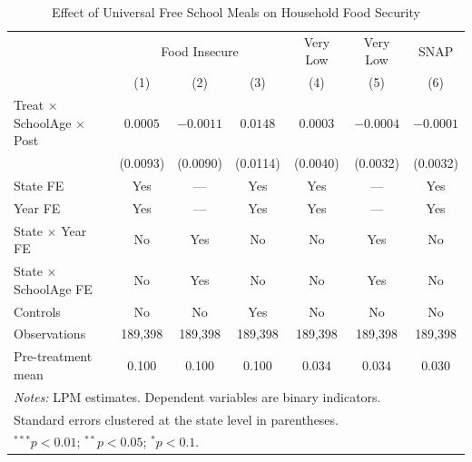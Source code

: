 \begin{table}[t]
\centering
\caption{Effect of Universal Free School Meals on Household Food Security}
\label{tab:main}
\small
\begin{tabular}{lcccccc}
\hline\hline
 & \multicolumn{3}{c}{Food Insecure} & Very Low & Very Low & SNAP \\
 & (1) & (2) & (3) & (4) & (5) & (6) \\
\hline
Treat $\times$ SchoolAge $\times$ Post & $0.0005$ & $-0.0011$ & $0.0148$ & $0.0003$ & $-0.0004$ & $-0.0001$ \\
 & (0.0093) & (0.0090) & (0.0114) & (0.0040) & (0.0032) & (0.0032) \\
\addlinespace
State FE & Yes & --- & Yes & Yes & --- & Yes \\
Year FE & Yes & --- & Yes & Yes & --- & Yes \\
State $\times$ Year FE & No & Yes & No & No & Yes & No \\
State $\times$ SchoolAge FE & No & Yes & No & No & Yes & No \\
Controls & No & No & Yes & No & No & No \\
Observations & 189,398 & 189,398 & 189,398 & 189,398 & 189,398 & 189,398 \\
Pre-treatment mean & 0.100 & 0.100 & 0.100 & 0.034 & 0.034 & 0.030 \\
\hline
\multicolumn{7}{l}{\footnotesize \textit{Notes:} LPM estimates. Dependent variables are binary indicators.} \\
\multicolumn{7}{l}{\footnotesize Standard errors clustered at the state level in parentheses.} \\
\multicolumn{7}{l}{\footnotesize $^{***}p<0.01$; $^{**}p<0.05$; $^{*}p<0.1$.} \\
\end{tabular}
\end{table}
